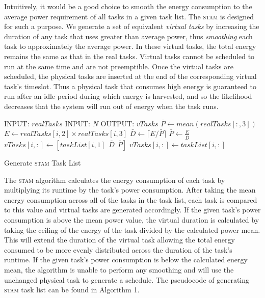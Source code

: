 Intuitively, it would be a good choice to smooth the energy consumption to the average power requirement of all tasks in a given task list. The \textsc{stam} is designed for such a purpose. We generate a set of equivalent \emph{virtual tasks} by increasing the duration of any task that uses greater than average power, thus \emph{smoothing} each task to approximately the average power. In these virtual tasks, the total energy remains the same as that in the real tasks.  Virtual tasks cannot be scheduled to run at the same time and are not preemptible.  Once the virtual tasks are scheduled, the physical tasks are inserted at the end of the corresponding virtual task's timeslot.  Thus a physical task that consumes high energy is guaranteed to run after an idle period during which energy is harvested, and so the likelihood decreases that the system will run out of energy when the task runs. 

\begin{algorithm}[htb]
\label{stamalg}
\begin{algorithmic}
\STATE INPUT: $realTasks$  
\STATE INPUT: $N$ 
\STATE OUTPUT: $vTasks$ 
\STATE $\bar{P} \gets mean(realTasks[:,3])$
\STATE $E \gets realTasks[i, 2] \times realTasks[i,3]$
\STATE $\bar{D} \gets \lceil E / \bar{P} \rceil$
\STATE $\bar{P} \gets \frac{E}{\bar{D}}$
\STATE $vTasks[i,:] \gets [taskList[i,1]~~\bar{D}~~\bar{P}]$
\ELSE
\STATE $vTasks[i,:] \gets taskList[i,:]$
\ENDIF
\ENDFOR
\end{algorithmic}
\caption{Generate \textsc{stam} Task List}
\end{algorithm}

The \textsc{stam} algorithm calculates the energy consumption of each task by multiplying its runtime by the task's power consumption. After taking the mean energy consumption across all of the tasks in the task list, each task is compared to this value and virtual tasks are generated accordingly. If the given task's power consumption is above the mean power value, the virtual duration is calculated by taking the ceiling of the energy of the task divided by the calculated power mean. This will extend the duration of the virtual task allowing the total energy consumed to be more evenly distributed across the duration of the task's runtime. If the given task's power consumption is below the calculated energy mean, the algorithm is unable to perform any smoothing and will use the unchanged physical task to generate a schedule. The pseudocode of generating \textsc{stam} task list can be found in Algorithm 1.  

